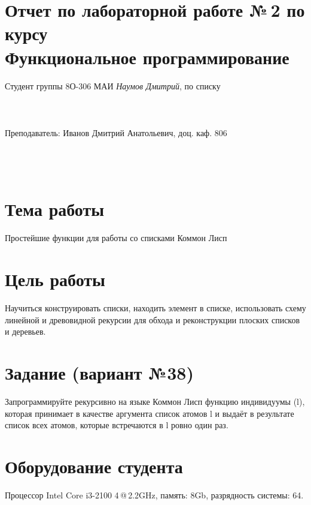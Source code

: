 \documentclass[12pt]{article}
\begin{document}
\section*{Отчет по лабораторной работе №\,2 
по курсу \\
\guillemotleft Функциональное программирование\guillemotright}
\begin{flushright}
Студент группы 8О-306 МАИ \textit{Наумов Дмитрий},  по списку \\
 \\
 \\
\ \\
Преподаватель: Иванов Дмитрий Анатольевич, доц. каф. 806 \\
 \\
 \\
 \\

\end{flushright}

\section{Тема работы}
Простейшие функции для работы со списками Коммон Лисп

\section{Цель работы}
Научиться конструировать списки, находить элемент в списке, использовать схему линейной и древовидной рекурсии для обхода и реконструкции плоских списков и деревьев.

\section{Задание (вариант №38)}
Запрограммируйте рекурсивно на языке Коммон Лисп функцию индивидуумы (l), которая принимает в качестве аргумента список атомов l и выдаёт в результате список всех атомов, которые встречаются в l ровно один раз.

\section{Оборудование студента}
Процессор Intel Core i3-2100 4\,@\,2.2GHz, память: 8Gb, разрядность системы: 64.
\end{document}
